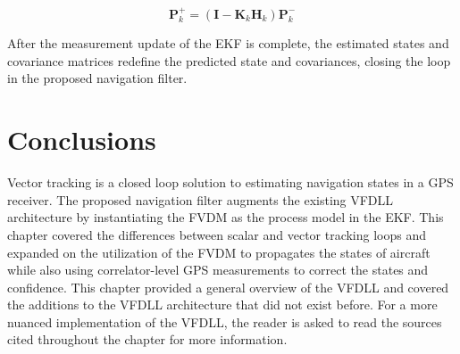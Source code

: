 \begin{equation}\label{eq:pplus}
    \mathbf{P}^+_k = \left(\mathbf{I} - \mathbf{K}_k\mathbf{H}_k\right)\mathbf{P}^-_k
\end{equation}

After the measurement update of the EKF is complete, the estimated states and covariance matrices redefine the predicted state and covariances, closing the loop in the proposed navigation filter.

\section{\textbf{Conclusions}}
Vector tracking is a closed loop solution to estimating navigation states in a GPS receiver. The proposed navigation filter augments the existing VFDLL architecture by instantiating the FVDM as the process model in the EKF\@. This chapter covered the differences between scalar and vector tracking loops and expanded on the utilization of the FVDM to propagates the states of aircraft while also using correlator-level GPS measurements to correct the states and confidence. This chapter provided a general overview of the VFDLL and covered the additions to the VFDLL architecture that did not exist before. For a more nuanced implementation of the VFDLL, the reader is asked to read the sources cited throughout the chapter for more information.